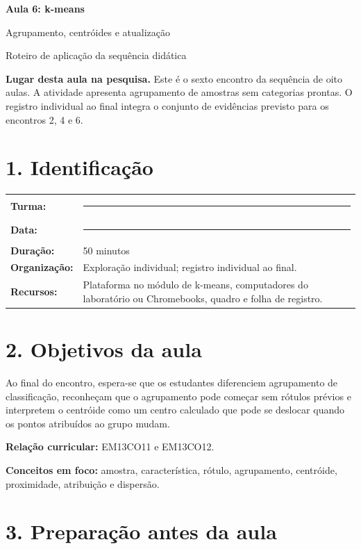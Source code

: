 \documentclass[12pt,a4paper]{article}
\newcommand{\bloco}[1]{%
  \vspace{0.25em}
  \noindent\colorbox{cinza}{\parbox{0.96\linewidth}{#1}}%
  \vspace{0.3em}
}
\begin{document}
\begin{center}
  {\LARGE\bfseries\color{azul} Aula 6: k-means}\par
  \vspace{0.25em}
  {\large Agrupamento, centróides e atualização}\par
  \vspace{0.35em}
  {\small Roteiro de aplicação da sequência didática}\par
\end{center}

\bloco{\textbf{Lugar desta aula na pesquisa.} Este é o sexto encontro da sequência de oito aulas. A atividade apresenta agrupamento de amostras sem categorias prontas. O registro individual ao final integra o conjunto de evidências previsto para os encontros 2, 4 e 6.}

\section*{1. Identificação}

\begin{tabularx}{\linewidth}{@{}>{\bfseries}p{4.1cm}X@{}}
Turma: & \rule{8.5cm}{0.35pt} \\
Data: & \rule{8.5cm}{0.35pt} \\
Duração: & 50 minutos \\
Organização: & Exploração individual; registro individual ao final. \\
Recursos: & Plataforma no módulo de k-means, computadores do laboratório ou Chromebooks, quadro e folha de registro. \\
\end{tabularx}

\section*{2. Objetivos da aula}

Ao final do encontro, espera-se que os estudantes diferenciem agrupamento de classificação, reconheçam que o agrupamento pode começar sem rótulos prévios e interpretem o centróide como um centro calculado que pode se deslocar quando os pontos atribuídos ao grupo mudam.

\textbf{Relação curricular:} EM13CO11 e EM13CO12.

\textbf{Conceitos em foco:} amostra, característica, rótulo, agrupamento, centróide, proximidade, atribuição e dispersão.

\section*{3. Preparação antes da aula}
\end{document}
